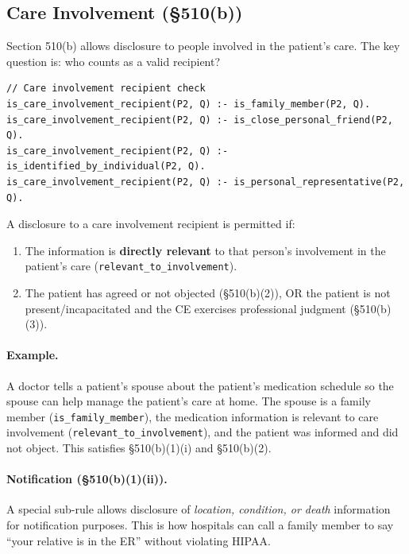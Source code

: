 \documentclass[11pt,letterpaper]{article}
\begin{document}
\subsection{Care Involvement (\S 510(b))}

Section 510(b) allows disclosure to people involved in the patient's care. The key question is: who counts as a valid recipient?

\begin{lstlisting}[style=soufflestyle,caption={Who can receive care involvement disclosures}]
// Care involvement recipient check
is_care_involvement_recipient(P2, Q) :- is_family_member(P2, Q).
is_care_involvement_recipient(P2, Q) :- is_close_personal_friend(P2, Q).
is_care_involvement_recipient(P2, Q) :- is_identified_by_individual(P2, Q).
is_care_involvement_recipient(P2, Q) :- is_personal_representative(P2, Q).
\end{lstlisting}

A disclosure to a care involvement recipient is permitted if:
\begin{enumerate}
  \item The information is \textbf{directly relevant} to that person's involvement in the patient's care (\texttt{relevant\_to\_involvement}).
  \item The patient has agreed or not objected (\S 510(b)(2)), OR the patient is not present/incapacitated and the CE exercises professional judgment (\S 510(b)(3)).
\end{enumerate}

\paragraph{Example.} A doctor tells a patient's spouse about the patient's medication schedule so the spouse can help manage the patient's care at home. The spouse is a family member (\texttt{is\_family\_member}), the medication information is relevant to care involvement (\texttt{relevant\_to\_involvement}), and the patient was informed and did not object. This satisfies \S 510(b)(1)(i) and \S 510(b)(2).

\paragraph{Notification (\S 510(b)(1)(ii)).} A special sub-rule allows disclosure of \emph{location, condition, or death} information for notification purposes. This is how hospitals can call a family member to say ``your relative is in the ER'' without violating HIPAA.
\end{document}
